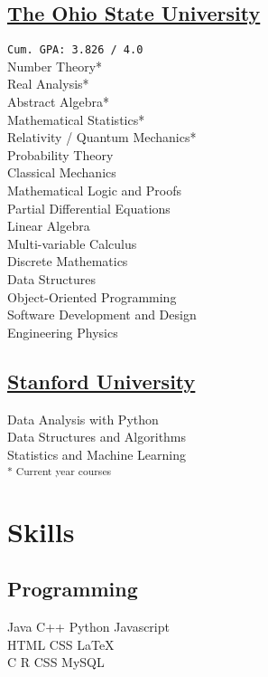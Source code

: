 \documentclass[]{Farhan_Resume_Class}
\begin{document}
\begin{minipage}[t]{0.25\textwidth}
    \subsection{\href{https://www.osu.edu/}{The Ohio State University}}
    \texttt{Cum. GPA: 3.826 / 4.0} \\
    Number Theory* \\
    Real Analysis* \\
    Abstract Algebra* \\
    Mathematical Statistics* \\
    Relativity / Quantum Mechanics* \\
    Probability Theory \\
    Classical Mechanics \\
    Mathematical Logic and Proofs \\
    Partial Differential Equations \\
    Linear Algebra\\
    Multi-variable Calculus\\
    Discrete Mathematics\\
    Data Structures \\
    Object-Oriented Programming\\
    Software Development and Design\\
    Engineering Physics\\

    \sectionsep
    \subsection{\href{https://stanford.edu/}{Stanford University}}
    Data Analysis with Python \\
    Data Structures and Algorithms\\
    Statistics and Machine Learning \\

    \textsubscript{* Current year courses}


    \section{Skills}
    \subsection{Programming}
    Java \textbullet{}   C++ \textbullet{} Python \textbullet{} Javascript \\
    HTML \textbullet{} CSS \textbullet \LaTeX \\
    C \textbullet{} R \textbullet{} CSS \textbullet{} \textbullet{} MySQL \\
    \vspace{1em}

\end{minipage}
\end{document}
